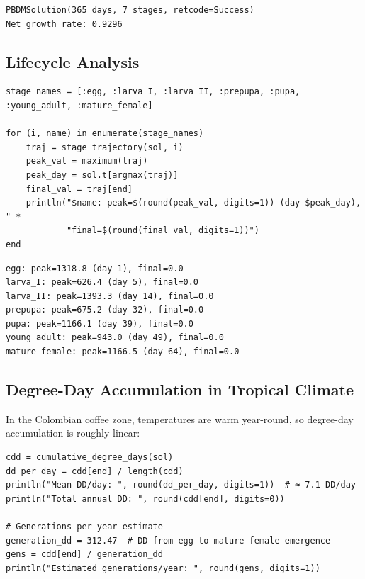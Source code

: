 \begin{verbatim}
PBDMSolution(365 days, 7 stages, retcode=Success)
Net growth rate: 0.9296
\end{verbatim}



\subsection{Lifecycle Analysis}



\label{10482967946597477501}{}



\begin{verbatim}
stage_names = [:egg, :larva_I, :larva_II, :prepupa, :pupa, :young_adult, :mature_female]

for (i, name) in enumerate(stage_names)
    traj = stage_trajectory(sol, i)
    peak_val = maximum(traj)
    peak_day = sol.t[argmax(traj)]
    final_val = traj[end]
    println("$name: peak=$(round(peak_val, digits=1)) (day $peak_day), " *
            "final=$(round(final_val, digits=1))")
end
\end{verbatim}




\begin{verbatim}
egg: peak=1318.8 (day 1), final=0.0
larva_I: peak=626.4 (day 5), final=0.0
larva_II: peak=1393.3 (day 14), final=0.0
prepupa: peak=675.2 (day 32), final=0.0
pupa: peak=1166.1 (day 39), final=0.0
young_adult: peak=943.0 (day 49), final=0.0
mature_female: peak=1166.5 (day 64), final=0.0
\end{verbatim}



\subsection{Degree-Day Accumulation in Tropical Climate}



\label{6977218708957707053}{}


In the Colombian coffee zone, temperatures are warm year-round, so degree-day accumulation is roughly linear:




\begin{verbatim}
cdd = cumulative_degree_days(sol)
dd_per_day = cdd[end] / length(cdd)
println("Mean DD/day: ", round(dd_per_day, digits=1))  # ≈ 7.1 DD/day
println("Total annual DD: ", round(cdd[end], digits=0))

# Generations per year estimate
generation_dd = 312.47  # DD from egg to mature female emergence
gens = cdd[end] / generation_dd
println("Estimated generations/year: ", round(gens, digits=1))
\end{verbatim}




